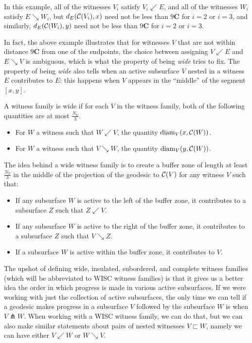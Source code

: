 \documentclass[12pt, reqno]{amsart}
\begin{document}
  In this example, all of the witnesses $V_i$ satisfy $V_i \swarrow E$, and all of the witnesses $W_i$ satisfy $E \searrow W_i$, but $d_E(\mathcal{C}(V_i), x)$ need not be less than $9\mathbf{C}$ for $i=2$ or $i=3$, and similarly, $d_E(\mathcal{C}(W_i), y)$ need not be less than $9 \mathbf{C}$ for $i=2$ or $i=3$.

  In fact, the above example illustrates that for witnesses $V$ that are not within distance $9 \mathbf{C}$ from one of the endpoints, the choice between assigning $V \swarrow E$ and $E \searrow V$ is ambiguous, which is what the property of being \emph{wide} tries to fix.
  The property of being \emph{wide} also tells when an active subsurface $V$ nested in a witness $E$ contributes to $E$: this happens when $V$ appears in the ``middle'' of the segment $[x,y]$.

  \begin{definition}
    A witness family is wide if for each $V$ in the witness family, both of the following quantities are at most $\frac{N_V}{3}$.
    \begin{itemize}
    \item For $W$ a witness such that $W \swarrow V$, the quantity $\mathrm{diam}_V(x, \mathcal{C}(W))$.
    \item For $W$ a witness such that $V \searrow W$, the quantity $\mathrm{diam}_V(y, \mathcal{C}(W))$.
    \end{itemize}
  \end{definition}

  The idea behind a wide witness family is to create a buffer zone of length at least $\frac{N_V}{3}$ in the middle of the projection of the geodesic to $\mathcal{C}(V)$ for any witness $V$ such that:
  \begin{itemize}
  \item If any subsurface $W$ is active to the left of the buffer zone, it contributes to a subsurface $Z$ such that $Z \swarrow V$.
  \item If any subsurface $W$ is active to the right of the buffer zone, it contributes to a subsurface $Z$ such that $V \searrow Z$.
  \item If a subsurface $W$ is active within the buffer zone, it contributes to $V$.
  \end{itemize}

  The upshot of defining wide, insulated, subordered, and complete witness families (which will be abbreviated to WISC witness families) is that it gives us a better idea the order in which progress is made in various active subsurfaces.
  If we were working with just the collection of active subsurfaces, the only time we can tell if a geodesic makes progress in a subsurface $V$ followed by the subsurface $W$ is when $V \pitchfork W$.
  When working with a WISC witness family, we can do that, but we can also make similar statements about pairs of nested witnesses $V \sqsubset W$, namely we can have either $V \swarrow W$ or $W \searrow V$.
\end{document}
